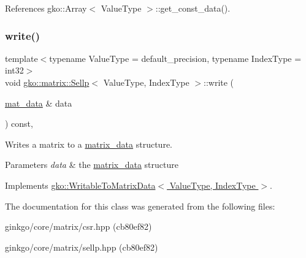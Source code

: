References gko\+::\+Array$<$ Value\+Type $>$\+::get\+\_\+const\+\_\+data().

\mbox{\label{classgko_1_1matrix_1_1Sellp_aae2355a2866318b154d017b1c51f30a5}} 
\subsubsection{\texorpdfstring{write()}{write()}}
{\footnotesize\ttfamily template$<$typename Value\+Type = default\+\_\+precision, typename Index\+Type = int32$>$ \\
void \hyperlink{classgko_1_1matrix_1_1Sellp}{gko\+::matrix\+::\+Sellp}$<$ Value\+Type, Index\+Type $>$\+::write (\begin{DoxyParamCaption}\item[{\hyperlink{structgko_1_1matrix__data}{mat\+\_\+data} \&}]{data }\end{DoxyParamCaption}) const\hspace{0.3cm}{\ttfamily [override]}, {\ttfamily [virtual]}}



Writes a matrix to a \hyperlink{structgko_1_1matrix__data}{matrix\+\_\+data} structure. 


\begin{DoxyParams}{Parameters}
{\em data} & the \hyperlink{structgko_1_1matrix__data}{matrix\+\_\+data} structure \\
\hline
\end{DoxyParams}


Implements \hyperlink{classgko_1_1WritableToMatrixData_a96036c3a4bf4c67fa93002808b8b14e2}{gko\+::\+Writable\+To\+Matrix\+Data$<$ Value\+Type, Index\+Type $>$}.



The documentation for this class was generated from the following files\+:\begin{DoxyCompactItemize}
\item 
ginkgo/core/matrix/csr.\+hpp (cb80ef82)\item 
ginkgo/core/matrix/sellp.\+hpp (cb80ef82)\end{DoxyCompactItemize}
